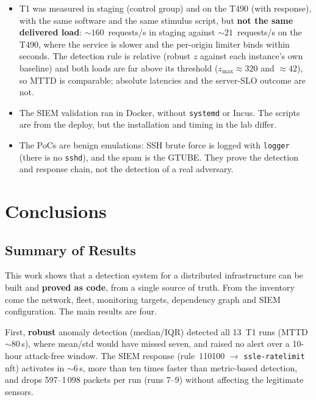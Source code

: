 \documentclass[11pt,a4paper]{article}
\begin{document}
\begin{itemize}
  \item T1 was measured in staging (control group) and on the T490 (with response), with the
    same software and the same stimulus script, but \textbf{not the same delivered load}:
    ${\sim}160$~requests/s in staging against ${\sim}21$~requests/s on the T490, where the
    service is slower and the per-origin limiter binds within seconds. The
    detection rule is relative (robust $z$ against each instance's own baseline) and both
    loads are far above its threshold ($z_{\max} \approx 320$ and $\approx 42$), so MTTD is
    comparable; absolute latencies and the server-SLO outcome are not.
  \item The SIEM validation ran in Docker, without \texttt{systemd} or Incus. The scripts are
    from the deploy, but the installation and timing in the lab differ.
  \item The PoCs are benign emulations: SSH brute force is logged with \texttt{logger} (there
    is no \texttt{sshd}), and the spam is the GTUBE. They prove the detection and response
    chain, not the detection of a real adversary.
\end{itemize}


\section{Conclusions}
\label{sec:conclusions}

\subsection{Summary of Results}

This work shows that a detection system for a distributed infrastructure can be built and
\textbf{proved as code}, from a single source of truth. From the inventory come the network,
fleet, monitoring targets, dependency graph and SIEM configuration. The main results are
four.

First, \textbf{robust} anomaly detection (median/IQR) detected all 13~T1 runs (MTTD ${\sim}80$\,s),
where mean/std would have missed seven, and raised no alert over a 10-hour attack-free window. The SIEM response
(rule~110100 $\to$ \texttt{ssle-ratelimit} nft) activates in ${\sim}6$\,s, more than ten
times faster than metric-based detection, and drops 597--1\,098 packets per run (runs 7--9) without
affecting the legitimate sensors.
\end{document}
